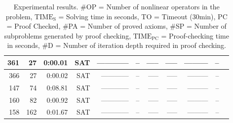 \begin{table}[h]
\begin{center}
\begin{tabular}{|r||r|r|r||r||c|r|r|r|r|r|}
      \hline
      361&       27&   0:00.01&       SAT&  ------------ &--& -----& -----& --------- & --\\
      \hline
      366&       27&   0:00.02&       SAT&  ------------ &--& -----& -----& --------- & --\\
      \hline
      147&       74&   0:08.81&       SAT&  ------------ &--& -----& -----& --------- & --\\
      \hline
      160&       82&   0:00.92&       SAT&  ------------ &--& -----& -----& --------- & --\\
      \hline
      158&      162&   0:01.67&       SAT&  ------------ &--& -----& -----& --------- & --\\
     \hline
    \end{tabular}
  \end{center}
  \caption{
    Experimental results.
    \#OP = Number of nonlinear operators in the problem,
    $\mathrm{TIME_S}$ = Solving time in seconds,
    TO = Timeout (30min),
    PC = Proof Checked,
    \#PA = Number of proved axioms,
    \#SP = Number of subproblems generated by proof checking,
    $\mathrm{TIME_{PC}}$ = Proof-checking time in seconds,
    \#D = Number of iteration depth required in proof checking.
  }\label{tbl:exp}
\end{table}
